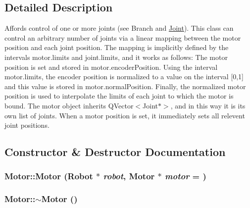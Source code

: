 \subsection{Detailed Description}
Affords control of one or more joints (see Branch and \hyperlink{class_robot_model_1_1_joint}{Joint}). This class can control an arbitrary number of joints via a linear mapping between the motor position and each joint position. The mapping is implicitly defined by the intervals motor.limits and joint.limits, and it works as follows: The motor position is set and stored in motor.encoderPosition. Using the interval motor.limits, the encoder position is normalized to a value on the interval \mbox{[}0,1\mbox{]} and this value is stored in motor.normalPosition. Finally, the normalized motor position is used to interpolate the limits of each joint to which the motor is bound. The motor object inherits QVector$<$Joint$\ast$$>$, and in this way it is its own list of joints. When a motor position is set, it immediately sets all relevent joint positions. 

\subsection{Constructor \& Destructor Documentation}
\hypertarget{class_robot_model_1_1_motor_afa8d3bb8b2ad45bdc8064efa0052dd04}{
\subsubsection[{Motor}]{\setlength{\rightskip}{0pt plus 5cm}Motor::Motor ({\bf Robot} $\ast$ {\em robot}, \/  {\bf Motor} $\ast$ {\em motor} = {})}}
\label{class_robot_model_1_1_motor_afa8d3bb8b2ad45bdc8064efa0052dd04}
\hypertarget{class_robot_model_1_1_motor_a2e57c7b2681efea1d3b7f253ee88ecd4}{
\subsubsection[{$\sim$Motor}]{\setlength{\rightskip}{0pt plus 5cm}Motor::$\sim$Motor ()}}
\label{class_robot_model_1_1_motor_a2e57c7b2681efea1d3b7f253ee88ecd4}



